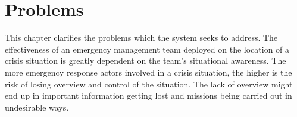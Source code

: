 \chapter{Problems}
\label{chap:problems}
This chapter clarifies the problems which the system seeks to address. 
The effectiveness of an emergency management team deployed on the location of a crisis situation is greatly dependent on the team's situational awareness. The more emergency response actors involved in a crisis situation, the higher is the risk of losing overview and control of the situation. The lack of overview might end up in important information getting lost and missions being carried out in undesirable ways. 

